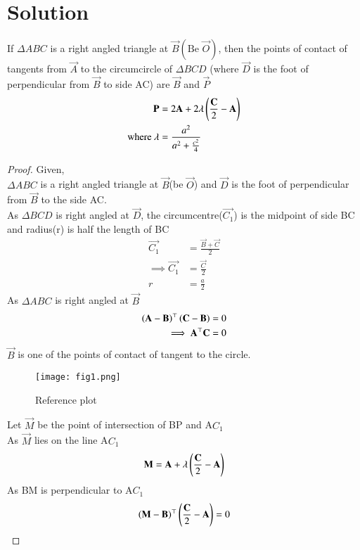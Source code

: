 \documentclass[journal,12pt,twocolumn]{IEEEtran}
\begin{document}
\section{Solution}
\begin{lemma}
If $\Delta ABC$ is a right angled triangle at $\vec{B}(\text{Be } \vec{O})$, then the points of contact of tangents from $\vec{A}$ to the circumcircle of $\Delta BCD$ (where $\vec{D}$ is the foot of perpendicular from $\vec{B}$ to side AC) are $\vec{B}$ and $\vec{P}$
\begin{align}
  \mathbf{P}&=2\mathbf{A}+2\lambda \left(\frac{\mathbf{C}}{2}-\mathbf{A}\right)\\
  \text{where  } \lambda &= \frac{a^2}{a^{2}+\frac{c^{2}}{4}}
\end{align}
\end{lemma}
\begin{proof}
Given,\\
$\Delta ABC$ is a right angled triangle at $\vec{B}$(be $\vec{O}$) and $\vec{D}$ is the foot of perpendicular from $\vec{B}$ to the side AC.\\
As $\Delta BCD$ is right angled at $\vec{D}$, the circumcentre($\vec{C_{1}}$) is the midpoint of side BC and radius(r) is half the length of BC
\begin{align}
    \vec{C_{1}}&=\frac{\vec{B}+\vec{C}}{2}\\
    \implies \vec{C_1}& = \frac{\vec{C}}{2}\\
    r&=\frac{a}{2}
\end{align}
As $\Delta ABC$ is right angled at $\vec{B}$
\begin{align}
\left(\mathbf{A}-\mathbf{B}\right)^\top\left(\mathbf{C}-\mathbf{B}\right)&=0\\
\implies \mathbf{A}^{\top}\mathbf{C}&=0
\label{eq1}
\end{align}
 $\vec{B}$ is one of the points of contact of tangent to the circle.
\begin{figure}[!ht]
   \centering
   \texttt{[image: fig1.png]}
   \caption{Reference plot}
\end{figure}
Let $\vec{M}$ be the point of intersection of BP and A$C_1$\\
As $\vec{M}$ lies on the line A$C_{1}$
\begin{align}
    \mathbf{M}=\mathbf{A}+\lambda\left(\frac{\mathbf{C}}{2}-\mathbf{A}\right)
\end{align}
As BM is perpendicular to A$C_1$
\begin{align}
    \brak{\vec{M}-\vec{B}}^\top \brak{\frac{\vec{C}}{2}-\vec{A}} &=0\\

\end{align}
\end{proof}
\end{document}
